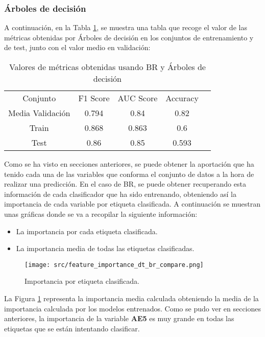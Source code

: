 \subsubsection*{Árboles de decisión}
A continuación, en la Tabla \ref{tab:ml_tab_dt}, se muestra una tabla que recoge el valor de las métricas obtenidas por Árboles de decisión en los conjuntos de entrenamiento y de test, junto con el valor medio en validación:
\begin{table}[H]
	\centering
	\begin{tabular}{|c|c|c|c|c}
		\cline{1-4}
		Conjunto         & F1 Score & AUC Score & Accuracy \\ \cline{1-4}
		Media Validación & 0.794    & 0.84      & 0.82     \\ \cline{1-4}
		Train            & 0.868    & 0.863     & 0.6      \\ \cline{1-4}
		Test             & 0.86     & 0.85      & 0.593    \\ \cline{1-4}
	\end{tabular}
	\caption{Valores de métricas obtenidas usando BR y Árboles de decisión}
	\label{tab:ml_tab_dt}
\end{table}
Como se ha visto en secciones anteriores, se puede obtener la aportación que ha tenido cada una de las variables que conforma el conjunto de datos a la hora de realizar una predicción. En el caso de BR, se puede obtener recuperando esta información de cada clasificador que ha sido entrenando, obteniendo así la importancia de cada variable por etiqueta clasificada.
A continuación se muestran unas gráficas donde se va a recopilar la siguiente información:
\begin{itemize}
	\item La importancia por cada etiqueta clasificada.
	\item La importancia media de todas las etiquetas clasificadas.
\end{itemize}
\begin{figure}[H]
	\centering
	\texttt{[image: src/feature\_importance\_dt\_br\_compare.png]}
	\caption{Importancia por etiqueta clasificada.}
	\label{fig:dt_br_label}
\end{figure}
La Figura \ref{fig:dt_br_label} representa la importancia media calculada obteniendo la media de la importancia calculada por los modelos entrenados. Como se pudo ver en secciones anteriores, la importancia de la variable \textbf{AE5} es muy grande en todas las etiquetas que se están intentando clasificar.\\
\linebreak
